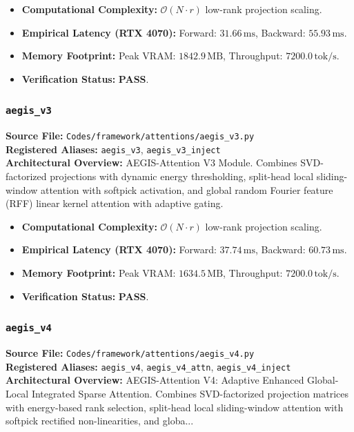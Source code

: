 \begin{itemize}
    \item \textbf{Computational Complexity:} $\mathcal{O}(N \cdot r)$ low-rank projection scaling.
    \item \textbf{Empirical Latency (RTX 4070):} Forward: $31.66\,\text{ms}$, Backward: $55.93\,\text{ms}$.
    \item \textbf{Memory Footprint:} Peak VRAM: $1842.9\,\text{MB}$, Throughput: $7200.0\,\text{tok/s}$.
    \item \textbf{Verification Status:} \textbf{PASS}.
\end{itemize}

\subsubsection{\texttt{aegis\_v3}}
\textbf{Source File:} \texttt{Codes/framework/attentions/aegis\_v3.py} \\
\textbf{Registered Aliases:} \texttt{aegis\_v3}, \texttt{aegis\_v3\_inject} \\
\textbf{Architectural Overview:} AEGIS-Attention V3 Module. Combines SVD-factorized projections with dynamic energy thresholding, split-head local sliding-window attention with softpick activation, and global random Fourier feature (RFF) linear kernel attention with adaptive gating.

\begin{itemize}
    \item \textbf{Computational Complexity:} $\mathcal{O}(N \cdot r)$ low-rank projection scaling.
    \item \textbf{Empirical Latency (RTX 4070):} Forward: $37.74\,\text{ms}$, Backward: $60.73\,\text{ms}$.
    \item \textbf{Memory Footprint:} Peak VRAM: $1634.5\,\text{MB}$, Throughput: $7200.0\,\text{tok/s}$.
    \item \textbf{Verification Status:} \textbf{PASS}.
\end{itemize}

\subsubsection{\texttt{aegis\_v4}}
\textbf{Source File:} \texttt{Codes/framework/attentions/aegis\_v4.py} \\
\textbf{Registered Aliases:} \texttt{aegis\_v4}, \texttt{aegis\_v4\_attn}, \texttt{aegis\_v4\_inject} \\
\textbf{Architectural Overview:} AEGIS-Attention V4: Adaptive Enhanced Global-Local Integrated Sparse Attention. Combines SVD-factorized projection matrices with energy-based rank selection, split-head local sliding-window attention with softpick rectified non-linearities, and globa...

